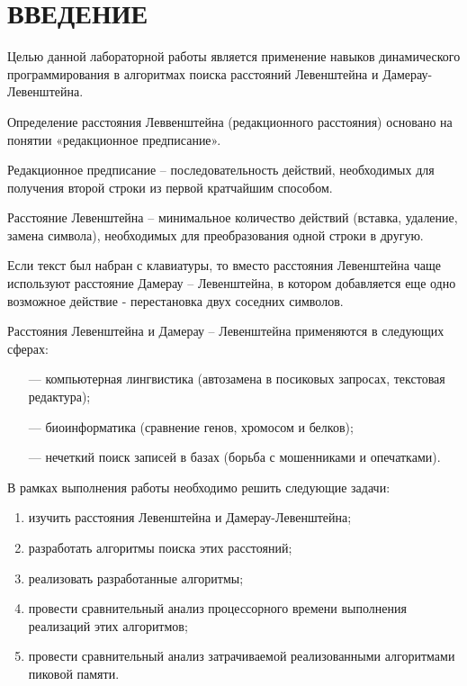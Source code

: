\chapter*{ВВЕДЕНИЕ}

Целью данной лабораторной работы является применение навыков динамического программирования в алгоритмах поиска расстояний Левенштейна и Дамерау-Левенштейна.

Определение расстояния Леввенштейна (редакционного расстояния) основано на понятии «редакционное предписание».

Редакционное предписание – последовательность действий, необходимых для получения второй строки из первой  кратчайшим способом. 

Расстояние Левенштейна – минимальное количество действий (вставка, удаление, замена символа), необходимых для преобразования одной строки в другую. 

Если текст был набран с клавиатуры, то вместо расстояния Левенштейна чаще используют расстояние Дамерау – Левенштейна, в котором добавляется еще одно возможное действие - перестановка двух соседних символов.~\cite{Passenger}

Расстояния Левенштейна и Дамерау – Левенштейна применяются в следующих сферах:
\begin{itemize}
	\item[---] компьютерная лингвистика (автозамена в посиковых запросах, текстовая редактура);
	\item[---] биоинформатика (сравнение генов, хромосом и белков);
	\item[---] нечеткий поиск записей в базах (борьба с мошенниками и опечатками).
\end{itemize}

В рамках выполнения работы необходимо решить следующие задачи: 
\begin{enumerate}[label={\arabic*)}]
	\item изучить расстояния Левенштейна и Дамерау-Левенштейна;
	\item разработать алгоритмы поиска этих расстояний;
	\item реализовать разработанные алгоритмы;
	\item провести сравнительный анализ процессорного времени выполнения реализаций этих алгоритмов;
	\item провести сравнительный анализ затрачиваемой реализованными алгоритмами пиковой памяти.
\end{enumerate}

